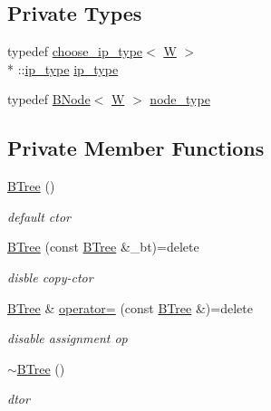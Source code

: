 \subsection*{Private Types}
\begin{DoxyCompactItemize}
\item 
typedef \hyperlink{types_8h_structchoose__ip__type}{choose\-\_\-ip\-\_\-type}$<$ \hyperlink{test__u128_8cpp_ab21b528bc38899d04d3a7053e52fb797}{W} $>$\\*
\-::\hyperlink{classBTree_a01d338c5749bb49768463706d9d2141c}{ip\-\_\-type} \hyperlink{classBTree_a01d338c5749bb49768463706d9d2141c}{ip\-\_\-type}
\item 
typedef \hyperlink{structBNode}{B\-Node}$<$ \hyperlink{test__u128_8cpp_ab21b528bc38899d04d3a7053e52fb797}{W} $>$ \hyperlink{classBTree_a6868250b9b4cb60d672f2c83be3889f4}{node\-\_\-type}
\end{DoxyCompactItemize}
\subsection*{Private Member Functions}
\begin{DoxyCompactItemize}
\item 
\hyperlink{classBTree_aa7f14edbaae29d2c8c3f8ebfd30e8455}{B\-Tree} ()
\begin{DoxyCompactList}\small\item\em default ctor \end{DoxyCompactList}\item 
\hyperlink{classBTree_a49aaa6a1c73bae5e3e71c4e9e49e6fe1}{B\-Tree} (const \hyperlink{classBTree}{B\-Tree} \&\-\_\-bt)=delete
\begin{DoxyCompactList}\small\item\em disble copy-\/ctor \end{DoxyCompactList}\item 
\hyperlink{classBTree}{B\-Tree} \& \hyperlink{classBTree_a27e5bd2681163797a7bb5cb2d8dbcd08}{operator=} (const \hyperlink{classBTree}{B\-Tree} \&)=delete
\begin{DoxyCompactList}\small\item\em disable assignment op \end{DoxyCompactList}\item 
\hyperlink{classBTree_ac5bace99cce39dcd0ad309912ac7e758}{$\sim$\-B\-Tree} ()
\begin{DoxyCompactList}\small\item\em dtor \end{DoxyCompactList}\end{DoxyCompactItemize}
